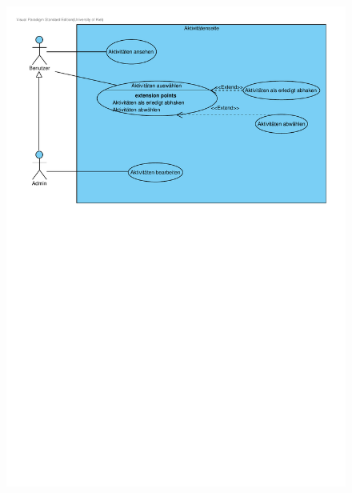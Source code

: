 \documentclass[10pt,a4paper]{article}
\begin{document}
	\begin{figure}[h]
		\includegraphics[width=\linewidth]{gfx/webseite/Aktivitaetenseite.pdf}
	\end{figure}
\end{document}
